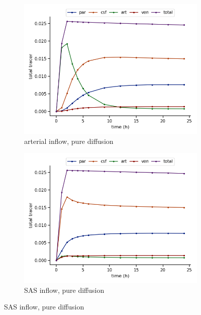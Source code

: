 \documentclass[fleqn,10pt]{wlscirep}
\begin{document}
\begin{figure}
     \centering
     \begin{subfigure}[b]{0.33\textwidth}
         \centering
         \includegraphics[width=\textwidth]{paper/figures/modelA_total_conc.png}
         \caption{arterial inflow, pure diffusion}
         \label{fig:y equals x}
     \end{subfigure}
     \hfill
     \begin{subfigure}[b]{0.33\textwidth}
         \centering
         \includegraphics[width=\textwidth]{paper/figures/modelB_total_conc.png}
         \caption{SAS inflow, pure diffusion}
         \label{fig:three sin x}
     \end{subfigure}
     \hfill

\end{figure}
\end{document}
